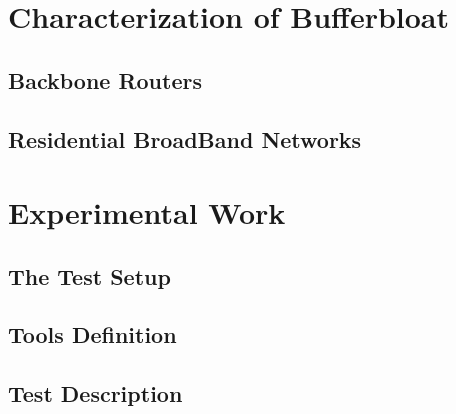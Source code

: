 \documentclass[letter, 11pt]{article}
\begin{document}
\section{Characterization of Bufferbloat}

\subsection{Backbone Routers}


\subsection{Residential BroadBand Networks}


\section{Experimental Work}


\subsection{The Test Setup}


\subsection{Tools Definition}


\subsection{Test Description}




{}
\end{document}

